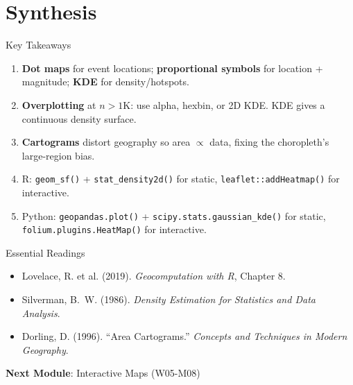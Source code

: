 \documentclass[10pt]{beamer}
\begin{document}
\section{Synthesis}
\begin{frame}{Key Takeaways}
\begin{enumerate}
\item \textbf{Dot maps} for event locations; \textbf{proportional symbols} for location + magnitude; \textbf{KDE} for density/hotspots.
\item \textbf{Overplotting} at $n > 1$K: use alpha, hexbin, or 2D KDE. KDE gives a continuous density surface.
\item \textbf{Cartograms} distort geography so area $\propto$ data, fixing the choropleth's large-region bias.
\item R: \texttt{geom\_sf()} + \texttt{stat\_density2d()} for static, \texttt{leaflet::addHeatmap()} for interactive.
\item Python: \texttt{geopandas.plot()} + \texttt{scipy.stats.gaussian\_kde()} for static, \texttt{folium.plugins.HeatMap()} for interactive.
\end{enumerate}
\end{frame}
\begin{frame}{Essential Readings}
\begin{itemize}
\item Lovelace, R. et al. (2019). \emph{Geocomputation with R}, Chapter 8.
\item Silverman, B.~W. (1986). \emph{Density Estimation for Statistics and Data Analysis}.
\item Dorling, D. (1996). ``Area Cartograms.'' \emph{Concepts and Techniques in Modern Geography}.
\end{itemize}
\vspace{6pt}
\textbf{Next Module}: Interactive Maps (W05-M08)
\end{frame}
\end{document}
